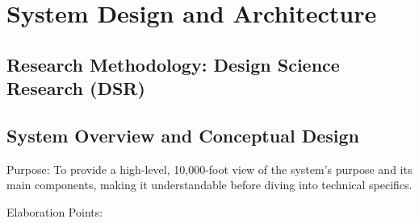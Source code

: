 \chapter{System Design and Architecture}


\section{Research Methodology: Design Science Research (DSR)}












\section{System Overview and Conceptual Design}

Purpose: To provide a high-level, 10,000-foot view of the system's purpose and its main components, making it understandable before diving into technical specifics.

Elaboration Points:


